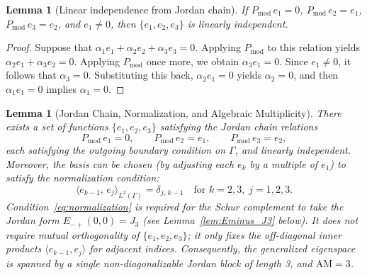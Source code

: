 \documentclass[12pt,a4paper]{amsart}
\newtheorem{lemma}[theorem]{Lemma}
\theoremstyle{remark}
\begin{document}
\begin{lemma}[Linear independence from Jordan chain]
\label{lem:jordan_indep}
If $P_{\mathrm{mod}}\,e_1 = 0$, $P_{\mathrm{mod}}\,e_2 = e_1$,
$P_{\mathrm{mod}}\,e_3 = e_2$, and $e_1 \neq 0$, then $\{e_1,e_2,e_3\}$
is linearly independent.
\end{lemma}

\begin{proof}
Suppose that $\alpha_1 e_1 + \alpha_2 e_2 + \alpha_3 e_3 = 0$.
Applying $P_{\mathrm{mod}}$ to this relation yields $\alpha_2 e_1 + \alpha_3 e_2 = 0$.
Applying $P_{\mathrm{mod}}$ once more, we obtain $\alpha_3 e_1 = 0$.
Since $e_1 \neq 0$, it follows that $\alpha_3 = 0$.
Substituting this back, $\alpha_2 e_1 = 0$ yields $\alpha_2 = 0$,
and then $\alpha_1 e_1 = 0$ implies $\alpha_1 = 0$.
\end{proof}

\begin{lemma}[Jordan Chain, Normalization, and Algebraic Multiplicity]
\label{lem:jordan_chain}
There exists a set of functions $\{e_1, e_2, e_3\}$ satisfying the Jordan chain relations
\[
  P_{\mathrm{mod}}\,e_1 = 0, \qquad
  P_{\mathrm{mod}}\,e_2 = e_1, \qquad
  P_{\mathrm{mod}}\,e_3 = e_2,
\]
each satisfying the outgoing boundary condition on $\Gamma$, and linearly independent.
Moreover, the basis can be chosen (by adjusting each $e_k$ by a multiple of $e_1$)
to satisfy the \emph{normalization condition}:
\begin{equation}\label{eq:normalization}
  \langle e_{k-1},\, e_j \rangle_{L^2(\Gamma)} = \delta_{j,\,k-1}
  \quad\text{for } k = 2,3,\; j = 1,2,3.
\end{equation}
Condition~\eqref{eq:normalization} is required for the Schur complement to take the
Jordan form $E_{-+}(0,0) = J_3$ (see Lemma~\ref{lem:Eminus_J3} below).
It does not require mutual orthogonality of $\{e_1,e_2,e_3\}$; it only fixes the
off-diagonal inner products $\langle e_{k-1}, e_j\rangle$ for adjacent indices.
Consequently, the generalized eigenspace is spanned by a single non-diagonalizable Jordan block
of length 3, and $\mathrm{AM} = 3$.
\end{lemma}
\end{document}
